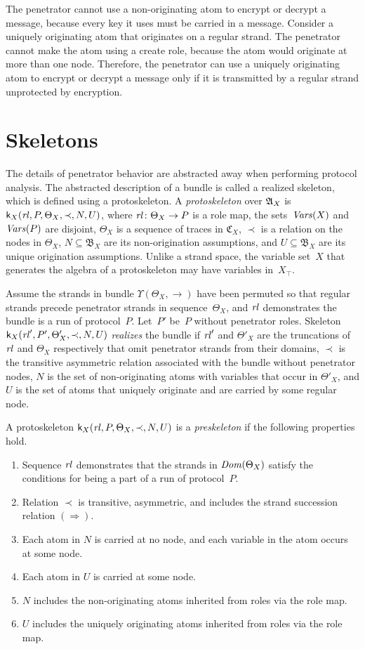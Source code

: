 \documentclass[12pt]{article}
\theoremstyle{definition}
\newcommand{\alga}{\alg{A}}
\newcommand{\tr}{\ensuremath{\mathfrak C}}
\newcommand{\base}{\ensuremath{\mathfrak B}}
\newcommand{\sdom}{\fn{Dom}}
\newcommand{\svars}{\fn{Vars}}
\newcommand{\skel}{\mathsf{k}}
\newcommand{\rl}{\fn{rl}}
\begin{document}
The penetrator cannot use a non-originating atom to encrypt or decrypt
a message, because every key it uses must be carried in a message.
Consider a uniquely originating atom that originates on a regular
strand.  The penetrator cannot make the atom using a create role,
because the atom would originate at more than one node.  Therefore,
the penetrator can use a uniquely originating atom to encrypt or
decrypt a message only if it is transmitted by a regular strand
unprotected by encryption.

\section{Skeletons}\label{sec:skeletons}

The details of penetrator behavior are abstracted away when performing
protocol analysis.  The abstracted description of a bundle is called a
realized skeleton, which is defined using a protoskeleton.  A
\emph{protoskeleton} over $\alga_X$ is
$\skel_X(\rl,P,\Theta_X,\prec,N,U)$, where $\rl\colon\Theta_X\to
P$ is a role map, the sets~$\svars(X)$ and~$\svars(P)$ are disjoint,
$\Theta_X$ is a sequence of traces in $\tr_X$, $\prec$ is a relation
on the nodes in $\Theta_X$, $N\subseteq\base_X$ are its
non-origination assumptions, and $U\subseteq\base_X$ are its unique
origination assumptions.  Unlike a strand space, the variable set~$X$
that generates the algebra of a protoskeleton may have variables
in~$X_\top$.

Assume the strands in bundle $\Upsilon(\Theta_X,\to)$ have been
permuted so that regular strands precede penetrator strands in
sequence~$\Theta_X$, and $\rl$ demonstrates the bundle is a run of
protocol~$P$.  Let~$P'$ be~$P$ without penetrator roles.
Skeleton $\skel_X(\rl',P',\Theta'_X,\prec,N,U)$
\emph{realizes} the bundle if $\rl'$ and $\Theta'_X$ are the
truncations of $\rl$ and $\Theta_X$ respectively that omit penetrator
strands from their domains, $\prec$ is the transitive asymmetric
relation associated with the bundle without penetrator nodes, $N$ is
the set of non-originating atoms with variables that occur in
$\Theta'_X$, and $U$ is the set of atoms that uniquely originate and
are carried by some regular node.

A protoskeleton $\skel_X(\rl,P,\Theta_X,\prec,N,U)$ is a
\emph{preskeleton} if the following properties hold.
\begin{enumerate}
\item Sequence $\rl$ demonstrates that the strands in $\sdom(\Theta_X)$
  satisfy the conditions for being a part of a run of protocol~$P$.
\item Relation $\prec$ is transitive, asymmetric, and includes the
  strand succession relation $(\Rightarrow)$.
\item Each atom in $N$ is carried at no node, and each variable
  in the atom occurs at some node.
\item Each atom in $U$ is carried at some node.
\item $N$ includes the non-originating atoms inherited from roles via
  the role map.
\item $U$ includes the uniquely originating atoms inherited from roles via
  the role map.
\end{enumerate}
\end{document}
